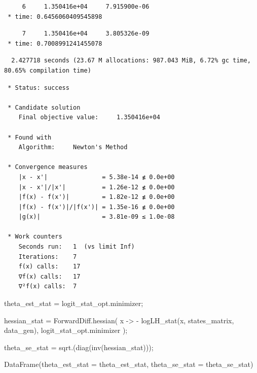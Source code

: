 \documentclass[
  letterpaper,
  DIV=11,
  numbers=noendperiod]{scrreprt}
\newenvironment{Shaded}{\begin{snugshade}}{\end{snugshade}}
\newcommand{\FunctionTok}[1]{\textcolor[rgb]{0.28,0.35,0.67}{#1}}
\newcommand{\NormalTok}[1]{\textcolor[rgb]{0.00,0.23,0.31}{#1}}
\newcommand{\OperatorTok}[1]{\textcolor[rgb]{0.37,0.37,0.37}{#1}}
\begin{document}
\begin{verbatim}
     6     1.350416e+04     7.915900e-06
 * time: 0.6456060409545898
\end{verbatim}

\begin{verbatim}
     7     1.350416e+04     3.805326e-09
 * time: 0.7008991241455078
\end{verbatim}

\begin{verbatim}
  2.427718 seconds (23.67 M allocations: 987.043 MiB, 6.72% gc time, 80.65% compilation time)
\end{verbatim}

\begin{verbatim}
 * Status: success

 * Candidate solution
    Final objective value:     1.350416e+04

 * Found with
    Algorithm:     Newton's Method

 * Convergence measures
    |x - x'|               = 5.38e-14 ≰ 0.0e+00
    |x - x'|/|x'|          = 1.26e-12 ≰ 0.0e+00
    |f(x) - f(x')|         = 1.82e-12 ≰ 0.0e+00
    |f(x) - f(x')|/|f(x')| = 1.35e-16 ≰ 0.0e+00
    |g(x)|                 = 3.81e-09 ≤ 1.0e-08

 * Work counters
    Seconds run:   1  (vs limit Inf)
    Iterations:    7
    f(x) calls:    17
    ∇f(x) calls:   17
    ∇²f(x) calls:  7
\end{verbatim}

\begin{Shaded}
\begin{Highlighting}[]
\NormalTok{theta\_est\_stat }\OperatorTok{=}\NormalTok{ logit\_stat\_opt.minimizer;}

\NormalTok{hessian\_stat }\OperatorTok{=}\NormalTok{ ForwardDiff.}\FunctionTok{hessian}\NormalTok{(}
\NormalTok{    x }\OperatorTok{{-}\textgreater{}} \OperatorTok{{-}} \FunctionTok{logLH\_stat}\NormalTok{(x, states\_matrix, data\_gen),}
\NormalTok{    logit\_stat\_opt.minimizer}
\NormalTok{    );}

\NormalTok{theta\_se\_stat }\OperatorTok{=} \FunctionTok{sqrt}\NormalTok{.(}\FunctionTok{diag}\NormalTok{(}\FunctionTok{inv}\NormalTok{(hessian\_stat)));}
\end{Highlighting}
\end{Shaded}

\begin{Shaded}
\begin{Highlighting}[]
\FunctionTok{DataFrame}\NormalTok{(theta\_est\_stat }\OperatorTok{=}\NormalTok{ theta\_est\_stat, theta\_se\_stat }\OperatorTok{=}\NormalTok{ theta\_se\_stat)}
\end{Highlighting}
\end{Shaded}
\end{document}
